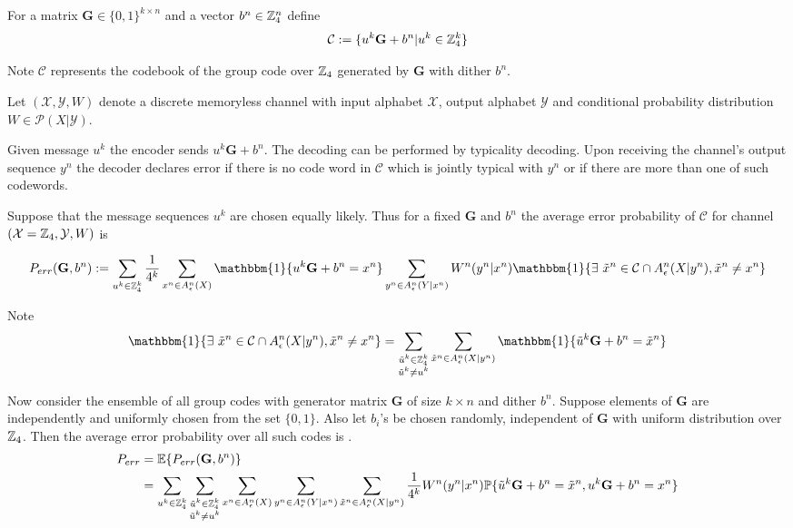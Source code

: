 \begin{definition}
For a matrix $\mathbf{G}\in \{0,1\}^{k \times n}$ and a vector $b^n\in \mathbb{Z}_4^n$ define  
\begin{equation}
\mathcal{C}:=\{ u^k\mathbf{G}+b^n|u^k\in \mathbb{Z}_4^k\}
\end{equation}

Note $\mathcal{C}$ represents the codebook of the group code over $\mathbb{Z}_4$ generated by $\mathbf{G}$ with dither $b^n$. 
\end{definition}

Let $(\mathcal{X},\mathcal{Y}, W)$ denote a discrete memoryless channel with input alphabet $\mathcal{X}$, output alphabet $\mathcal{Y}$ and conditional probability distribution $W \in \mathcal{P}(X|\mathcal{Y})$. 

Given message $u^k$ the encoder sends $u^k\mathbf{G}+b^n$. The decoding can be performed by typicality decoding. Upon receiving the channel's output sequence $y^n$ the decoder declares error if there is no code word in $\mathcal{C}$ which is jointly typical with $y^n$ or if there are more than one of such codewords. 

Suppose that the message sequences $u^k$ are chosen  equally likely. Thus for a fixed $\mathbf{G}$ and $b^n$ the average error probability of $\mathcal{C}$ for channel $(\mathcal{X}=\mathbb{Z}_4, \mathcal{Y},W)$ is

\begin{align*}
P_{err}(\mathbf{G},b^n):=\sum_{u^k\in \ZZ_4^k}\frac{1}{4^k} \sum_{x^n\in A_\epsilon^n(X)} \mathbbm{1}\{ u^k \mathbf{G}+b^n=x^n\} \sum_{y^n\in A_\epsilon^n(Y|x^n)}  W^n(y^n|x^n) \mathbbm{1}\{ \exists ~ \tilde{x}^n\in \mathcal{C} \cap A_\epsilon^n(X|y^n), \tilde{x}^n\neq x^n \}
\end{align*}

Note
\begin{align*}
\mathbbm{1}\{ \exists ~ \tilde{x}^n\in \mathcal{C} \cap A_\epsilon^n(X|y^n), \tilde{x}^n\neq x^n \}=\sum_{\substack{\tilde{u}^k \in \ZZ_4^k \\\tilde{u}^k\neq u^k}}\sum_{\tilde{x}^n\in A_\epsilon^n(X|y^n)}\mathbbm{1}\{ \tilde{u}^k\mathbf{G}+b^n=\tilde{x}^n\}
\end{align*}

Now consider the ensemble of all group codes with generator matrix $\mathbf{G}$ of size $k \times n$ and dither $b^n$. Suppose elements of $\mathbf{G}$  are independently and uniformly chosen from the set $\{ 0,1\}$. Also let $b_i$'s be chosen randomly, independent of $\mathbf{G}$ with uniform distribution over $\mathbb{Z}_4$. Then the average error probability over all such codes is
.
\begin{align}\label{equ: p_err}
P_{err}&=\mathbb{E}\{ P_{err}(\mathbf{G},b^n) \}\\
&=\sum_{u^k\in \mathbb{Z}_4^k} \sum_{\substack{\tilde{u}^k \in \mathbb{Z}_4^k \\\tilde{u}^k\neq u^k}} \sum_{x^n\in A_\epsilon^n(X)} \sum_{y^n\in A_\epsilon^n(Y|x^n)} \sum_{\tilde{x}^n\in A_\epsilon^n(X|y^n)} \frac{1}{4^k} W^n(y^n|x^n) \mathbb{P}\{ \tilde{u}^k\mathbf{G}+b^n=\tilde{x}^n, u^k \mathbf{G}+b^n=x^n\} 
\end{align}


